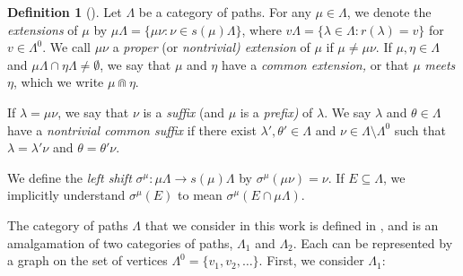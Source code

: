 \documentclass[12pt]{amsart}
\newcommand{\sm}{\setminus}
\newcommand{\sse}{\subseteq}
\newcommand{\emp}{\emptyset}
\renewcommand{\th}{\theta}
\newcommand{\la}{\lambda}
\newcommand{\La}{\Lambda}
\newcommand{\si}{\sigma}
\theoremstyle{plain} %
\theoremstyle{definition} %
\newtheorem{Definition}[Theorem]{Definition}
\begin{document}
\begin{Definition}[\cite{Spi14}]\label{def shift map}
    Let $\La$ be a category of paths. For any $\mu \in \La$, we denote the \textit{extensions} of $\mu$ by $\mu\La = \{\mu \nu : \nu \in s(\mu) \La\}$, where $v \La = \{\la \in \La : r(\la) = v\}$ for $v \in \La^0$. We call $\mu \nu$ a \textit{proper} (or \textit{nontrivial) extension} of $\mu$ if $\mu \neq \mu \nu$. If $\mu, \eta \in \La$ and $\mu \La \cap \eta \La \neq \emp$, we say that $\mu$ and $\eta$ have a \textit{common extension,} or that $\mu$ \textit{meets} $\eta$, which we write $\mu \Cap \eta$.
    
    If $\la = \mu \nu$, we say that $\nu$ is a \textit{suffix} (and $\mu$ is a \textit{prefix)} 
    of $\la$. 
    We say $\la$ and $\th \in \La$ have a \textit{nontrivial common suffix} if there exist $\la', \th' \in \La$ and $\nu \in \La\sm \La^0$ such that $\la = \la' \nu$ and $\th = \th' \nu$. 

   
    
    We define the \textit{left shift} $\si^{\mu} : \mu\La \to s(\mu) \La$ by $\si^{\mu}(\mu \nu) = \nu$. If $E \sse \La$, we implicitly understand $\si^{\mu}(E)$ to mean $\si^{\mu}(E \cap \mu \La)$. 
\end{Definition}


The category of paths $\Lambda$ that we consider in this work is defined in \cite[Section 3]{MS22}, and is an amalgamation of two categories of paths, $\Lambda_1$ and $\Lambda_2$. Each can be represented by a graph on the set of vertices $\Lambda^0 = \{v_1, v_2, \dots\}$. First, we consider $\Lambda_1$:
\end{document}

